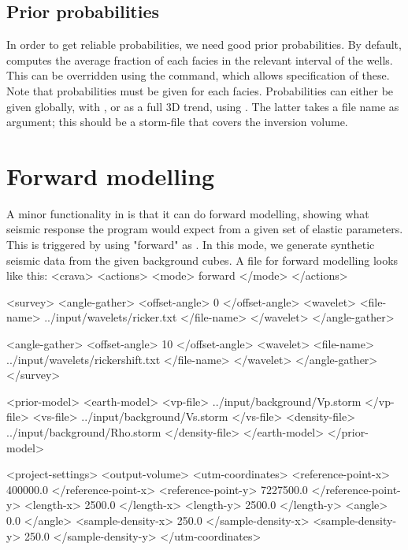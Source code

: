 \subsection{Prior probabilities}
In order to get reliable probabilities, we need good prior
probabilities. By default, \crava computes the average fraction of
each facies in the relevant interval of the wells. This can be
overridden using the  command, which
allows specification of these. Note that probabilities must be given
for each facies. Probabilities can either be given globally, with
, or as a full 3D trend, using
. The latter takes a file name as argument; this
should be a storm-file that covers the inversion volume. 

\section{Forward modelling}
\label{sec:forwardusr}
A minor functionality in \crava is that it can do forward modelling,
showing what seismic response the program would expect from a given
set of elastic parameters. This is triggered by using "forward" as
. In this mode, we generate synthetic seismic data from the
given background cubes. A file for forward modelling looks like this: 
<crava>
<actions>
  <mode> forward </mode>
</actions>

<survey>
  <angle-gather>
    <offset-angle>  0 </offset-angle>
    <wavelet>
      <file-name> ../input/wavelets/ricker.txt      </file-name>
    </wavelet>
  </angle-gather>

  <angle-gather>
    <offset-angle> 10 </offset-angle>
    <wavelet>
      <file-name> ../input/wavelets/rickershift.txt </file-name>
    </wavelet>
  </angle-gather>
</survey>

<prior-model>
  <earth-model>
    <vp-file>      ../input/background/Vp.storm  </vp-file>
    <vs-file>      ../input/background/Vs.storm  </vs-file>
    <density-file> ../input/background/Rho.storm </density-file>
  </earth-model>
</prior-model>

<project-settings>
  <output-volume>
    <utm-coordinates>
      <reference-point-x>  400000.0 </reference-point-x>
      <reference-point-y> 7227500.0 </reference-point-y>
      <length-x>             2500.0 </length-x>
      <length-y>             2500.0 </length-y>
      <angle>                   0.0 </angle>
      <sample-density-x>      250.0 </sample-density-x>
      <sample-density-y>      250.0 </sample-density-y>
    </utm-coordinates>

